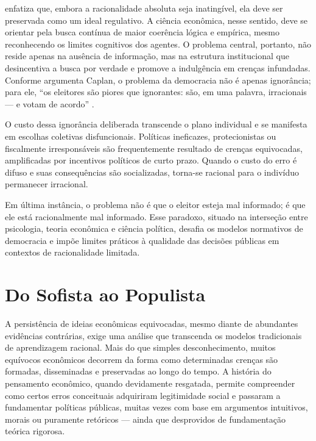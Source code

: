  enfatiza que, embora a racionalidade absoluta seja inatingível, ela deve ser preservada como um ideal regulativo. A ciência econômica, nesse sentido, deve se orientar pela busca contínua de maior coerência lógica e empírica, mesmo reconhecendo os limites cognitivos dos agentes. O problema central, portanto, não reside apenas na ausência de informação, mas na estrutura institucional que desincentiva a busca por verdade e promove a indulgência em crenças infundadas. Conforme argumenta Caplan, o problema da democracia não é apenas ignorância; para ele, ``os eleitores são piores que ignorantes: são, em uma palavra, irracionais — e votam de acordo'' \cite[p.~2]{The_Myth_of_the_Rational_Voter}.

O custo dessa ignorância deliberada transcende o plano individual e se manifesta em escolhas coletivas disfuncionais. Políticas ineficazes, protecionistas ou fiscalmente irresponsáveis são frequentemente resultado de crenças equivocadas, amplificadas por incentivos políticos de curto prazo. Quando o custo do erro é difuso e suas consequências são socializadas, torna-se racional para o indivíduo permanecer irracional.

Em última instância, o problema não é que o eleitor esteja mal informado; é que ele está racionalmente mal informado. Esse paradoxo, situado na interseção entre psicologia, teoria econômica e ciência política, desafia os modelos normativos de democracia e impõe limites práticos à qualidade das decisões públicas em contextos de racionalidade limitada.

\section{Do Sofista ao Populista} %


A persistência de ideias econômicas equivocadas, mesmo diante de abundantes evidências contrárias, exige uma análise que transcenda os modelos tradicionais de aprendizagem racional. Mais do que simples desconhecimento, muitos equívocos econômicos decorrem da forma como determinadas crenças são formadas, disseminadas e preservadas ao longo do tempo. A história do pensamento econômico, quando devidamente resgatada, permite compreender como certos erros conceituais adquiriram legitimidade social e passaram a fundamentar políticas públicas, muitas vezes com base em argumentos intuitivos, morais ou puramente retóricos — ainda que desprovidos de fundamentação teórica rigorosa.

